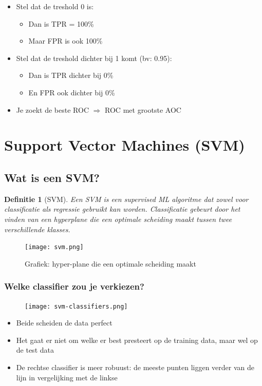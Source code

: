 \documentclass{article}
\newtheorem{theorem}{Definitie}[section]
\begin{document}
\begin{itemize}
    \item Stel dat de treshold 0 is:
    \begin{itemize}
        \item Dan is TPR = 100\%
        \item Maar FPR is ook 100\%
    \end{itemize}
    \item Stel dat de treshold dichter bij 1 komt (bv: 0.95):
    \begin{itemize}
        \item Dan is TPR dichter bij 0\%
        \item En FPR ook dichter bij 0\%
    \end{itemize}
    \item Je zoekt de beste ROC $\Rightarrow$ ROC met grootste AOC
\end{itemize}

\section{Support Vector Machines (SVM)}

\subsection{Wat is een SVM?}

\begin{theorem}[SVM]
Een SVM is een supervised ML algoritme dat zowel voor classificatie als regressie
gebruikt kan worden. Classificatie gebeurt door het vinden van een hyperplane die
een optimale scheiding maakt tussen twee verschillende klasses.
\end{theorem}

\begin{figure}[H]
    \centering
    \texttt{[image: svm.png]}
    \caption{Grafiek: hyper-plane die een optimale scheiding maakt}
\end{figure}

\subsubsection{Welke classifier zou je verkiezen?}

\begin{figure}[H]
    \centering
    \texttt{[image: svm-classifiers.png]}
\end{figure}

\begin{itemize}
    \item Beide scheiden de data perfect
    \item Het gaat er niet om welke er best presteert op de training data, maar wel op de test data
    \item De rechtse classifier is meer robuust: de meeste punten liggen verder van de lijn in vergelijking met de linkse
\end{itemize}
\end{document}
